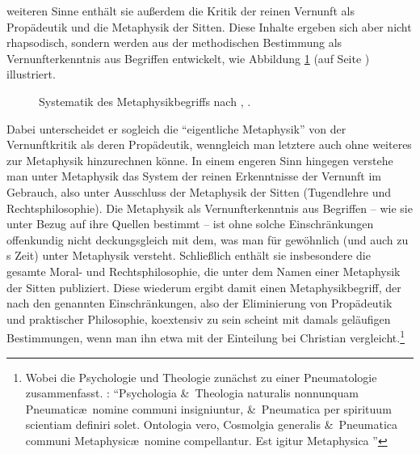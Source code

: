 \begin{nummerierung}
weiteren Sinne enthält sie außerdem die Kritik der reinen Vernunft als
Propädeutik und die Metaphysik der Sitten. Diese Inhalte ergeben sich aber nicht
rhapsodisch, sondern werden aus der methodischen Bestimmung als
Vernunfterkenntnis aus Begriffen entwickelt, wie Abbildung
\ref{abbildung:metaphysikeinteilung}
(auf Seite \pageref{abbildung:metaphysikeinteilung}) illustriert.
\begin{figure}[htb]
\begin{minipage}[t]{\textwidth}
\centering

  \caption{Systematik des Metaphysikbegriffs nach
  \cite[][B~869--875]{Kant:KritikderreinenVernunft2003}, \cite[][III:
  543.27--547.15]{Kant:GesammelteWerke1900ff.}.}\label{abbildung:metaphysikeinteilung}
\end{minipage}
\end{figure}
Dabei unterscheidet er sogleich die \enquote{eigentliche Metaphysik} von der Vernunftkritik als deren
Propädeutik, wenngleich man letztere auch ohne weiteres zur Metaphysik
hinzurechnen könne. In einem engeren Sinn hingegen verstehe man unter Metaphysik
das System der reinen Erkenntnisse der Vernunft im 
Gebrauch, also unter Ausschluss der Metaphysik der Sitten (Tugendlehre und
Rechtsphilosophie). Die Metaphysik als Vernunfterkenntnis aus Begriffen -- wie
sie  unter Bezug auf ihre Quellen bestimmt -- ist ohne
solche Einschränkungen offenkundig nicht deckungsgleich mit dem, was man für
gewöhnlich (und auch zu s Zeit) unter Metaphysik versteht.
Schließlich enthält sie insbesondere die gesamte Moral- und Rechtsphilosophie,
die  unter dem Namen einer Metaphysik der Sitten
publiziert.
Diese wiederum ergibt damit einen Metaphysikbegriff, der nach den genannten
Einschränkungen, also der Eliminierung von Propädeutik und praktischer
Philosophie, koextensiv zu sein
scheint mit damals geläufigen Bestimmungen, wenn man ihn etwa mit der Einteilung
bei Christian 
vergleicht.\footnote{\label{anmerkung:wolffseinteilungdermetaphysik} Wobei
 die Psychologie und Theologie zunächst zu einer Pneumatologie
zusammenfasst.
\cite[Vgl.][\S~79]{Wolff:Discursuspraeliminarisdephilosophiaingenere1996}:
\enquote{Psychologia \&\ Theologia naturalis nonnunquam Pneumatic\ae\ nomine communi insigniuntur, \&\ Pneumatica
per spirituum scientiam definiri solet. Ontologia vero, Cosmolgia generalis \&\
Pneumatica communi Metaphysic\ae\ nomine compellantur. Est igitur Metaphysica
}}
\end{nummerierung}
